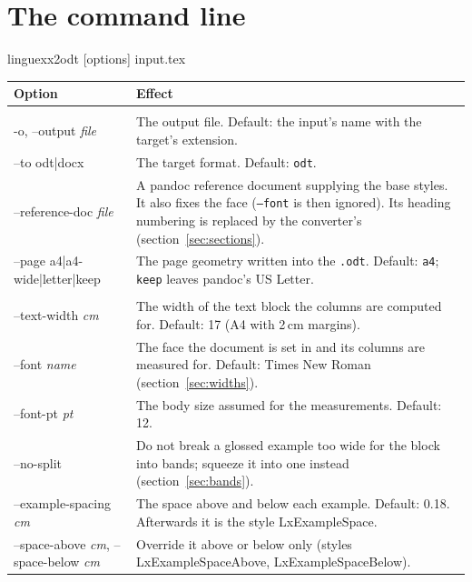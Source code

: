 \documentclass[11pt,a4paper]{article}
\newcommand{\opt}[1]{\texttt{#1}}
\newcommand{\file}[1]{\texttt{#1}}
\newcommand{\sty}[1]{\textsf{#1}}
\newcommand{\meta}[1]{\textrm{\itshape\textlangle#1\textrangle}}
\begin{document}
\section{The command line}\label{sec:cli}

\begin{code}
linguexx2odt [options] input.tex
\end{code}

\begin{longtable}{@{}>{\ttfamily}p{4.1cm} p{9.5cm}@{}}
\toprule
\normalfont\textbf{Option} & \textbf{Effect}\\
\midrule
\endhead
\multicolumn{2}{@{}l}{\emph{Output}}\\[2pt]
-o, --output \meta{file} & The output file. Default: the input's name with
  the target's extension.\\
--to odt|docx & The target format. Default: \texttt{odt}.\\
--reference-doc \meta{file} & A pandoc reference document supplying the base
  styles. It also fixes the face (\opt{--font} is then ignored). Its heading
  numbering is replaced by the converter's (section~\ref{sec:sections}).\\
--page a4|a4-wide|letter|keep & The page geometry written into the
  \file{.odt}. Default: \texttt{a4}; \texttt{keep} leaves pandoc's US Letter.\\[4pt]
\multicolumn{2}{@{}l}{\emph{Layout of the examples}}\\[2pt]
--text-width \meta{cm} & The width of the text block the columns are
  computed for. Default: 17 (A4 with 2\,cm margins).\\
--font \meta{name} & The face the document is set in and its columns are
  measured for. Default: Times New Roman (section~\ref{sec:widths}).\\
--font-pt \meta{pt} & The body size assumed for the measurements. Default: 12.\\
--no-split & Do not break a glossed example too wide for the block into
  bands; squeeze it into one instead (section~\ref{sec:bands}).\\
--example-spacing \meta{cm} & The space above and below each example.
  Default: 0.18. Afterwards it is the style \sty{LxExampleSpace}.\\
--space-above \meta{cm}, --space-below \meta{cm} & Override it above or below only
  (styles \sty{LxExampleSpaceAbove}, \sty{LxExampleSpaceBelow}).\\[4pt]

\end{longtable}
\end{document}
